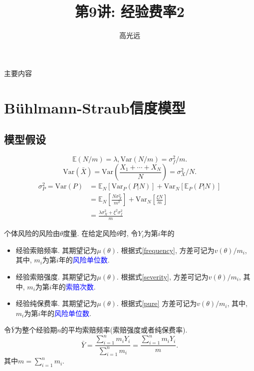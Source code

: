 \documentclass[professionalfont]{beamer}
\title{第9讲: 经验费率2}
\author{高光远}
\institute{中国人民大学~统计学院}
\date{}
\def\E{{\mathbb E}}  %
\newcommand{\blue}[1]{\textcolor{blue}{#1}}
\begin{document}
\begin{frame}
	\titlepage
\end{frame}

\begin{frame}{主要内容}
	\tableofcontents
\end{frame}





\section{B\"uhlmann-Straub信度模型}
\subsection{模型假设}
\begin{frame}
\begin{equation}\label{frequency}\E(N/m)=\lambda, \text{Var}(N/m)=\sigma_f^2/{m}.\end{equation} 
\begin{equation}\label{severity}\text{Var}(\bar{X})=\text{Var}\left(\frac{X_1+\cdots+X_N}{N}\right)=\sigma^2_X/N.\end{equation}
\begin{equation}\label{pure}
\begin{aligned}
\sigma^2_P=\text{Var}(P)&=\E_N\left[\text{Var}_P(P|N)\right]+\text{Var}_N\left[\E_P(P|N)\right]\\&=\E_N\left[\frac{N\sigma^2_X}{m^2}\right]+\text{Var}_N\left[\frac{\xi N}{m}\right]\\
&=\frac{\lambda\sigma^2_X+\xi^2\sigma^2_f}{m}
\end{aligned}
\end{equation}
\end{frame}
\begin{frame}
个体风险的风险由$\theta$度量. 在给定风险$\theta$时,  令$Y_i$为第$i$年的
\begin{itemize}
\item 经验索赔频率. 其期望记为$\mu(\theta)$. 根据式\eqref{frequency}, 方差可记为$v(\theta)/m_i$, 其中, $m_i$为第$i$年的\blue{风险单位数}. 
\item 经验索赔强度. 其期望记为$\mu(\theta)$.  根据式\eqref{severity}, 方差可记为$v(\theta)/m_i$, 其中, $m_i$为第$i$年的\blue{索赔次数}. 
\item 经验纯保费率. 其期望记为$\mu(\theta)$.   根据式\eqref{pure} 方差可记为$v(\theta)/m_i$, 其中,  $m_i$为第$i$年的\blue{风险单位数}. 
\end{itemize}
令$\bar{Y}$为整个经验期$n$的平均索赔频率(索赔强度或者纯保费率).
$$\bar{Y}=\frac{\sum_{i=1}^{n}m_iY_i}{\sum_{i=1}^{n}m_i}=\frac{\sum_{i=1}^{n}m_iY_i}{m}.$$
其中$m=\sum_{i=1}^{n}m_i$. 
\end{frame}
\end{document}
